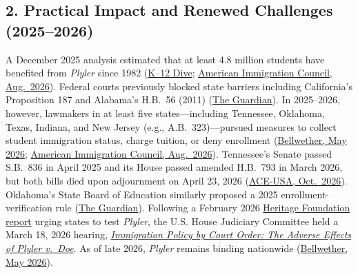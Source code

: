 \documentclass[12pt]{article}
\begin{document}
\subsection*{2. Practical Impact and Renewed Challenges (2025--2026)}
A December 2025 analysis estimated that at least 4.8 million students have benefited from \textit{Plyler} since 1982 (\href{https://www.k12dive.com/news/what-would-happen-if-undocumented-children-couldnt-attend-public-schools/807318/}{K--12 Dive}; \href{https://www.americanimmigrationcouncil.org/fact-sheet/plyler-v-doe-public-education-noncitizen-students/}{American Immigration Council, Aug.\ 2026}). Federal courts previously blocked state barriers including California's Proposition 187 and Alabama's H.B.\ 56 (2011) (\href{https://www.theguardian.com/us-news/2025/jan/28/oklahoma-schools-immigration-status}{The Guardian}). In 2025--2026, however, lawmakers in at least five states---including Tennessee, Oklahoma, Texas, Indiana, and New Jersey (e.g., A.B.\ 323)---pursued measures to collect student immigration status, charge tuition, or deny enrollment (\href{https://bellwether.org/publications/equal-protection-and-public-education-access-for-immigrant-students-a-50-state-review/}{Bellwether, May 2026}; \href{https://www.americanimmigrationcouncil.org/fact-sheet/plyler-v-doe-public-education-noncitizen-students/}{American Immigration Council, Aug.\ 2026}). Tennessee's Senate passed S.B.\ 836 in April 2025 and its House passed amended H.B.\ 793 in March 2026, but both bills died upon adjournment on April 23, 2026 (\href{https://ace-usa.org/blog/research/research-immigration/should-public-schools-collect-students-immigration-status-a-look-at-tennessees-debate/}{ACE-USA, Oct.\ 2026}). Oklahoma's State Board of Education similarly proposed a 2025 enrollment-verification rule (\href{https://www.theguardian.com/us-news/2025/jan/28/oklahoma-schools-immigration-status}{The Guardian}). Following a February 2026 \href{https://www.heritage.org/border-security/report/every-state-should-challenge-plyler-v-doe-time-end-free-education-illegal-0}{Heritage Foundation report} urging states to test \textit{Plyler}, the U.S. House Judiciary Committee held a March 18, 2026 hearing, \href{https://judiciary.house.gov/committee-activity/hearings/immigration-policy-court-order-adverse-effects-plyler-v-doe}{\textit{Immigration Policy by Court Order: The Adverse Effects of Plyler v.\ Doe}}. As of late 2026, \textit{Plyler} remains binding nationwide (\href{https://bellwether.org/publications/equal-protection-and-public-education-access-for-immigrant-students-a-50-state-review/}{Bellwether, May 2026}).
\end{document}
